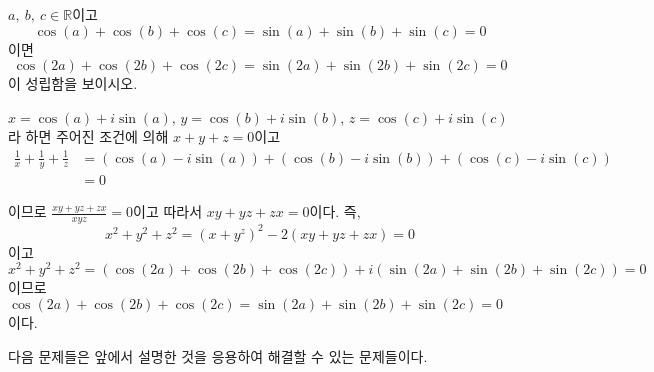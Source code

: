 \documentclass[11pt, a4paper]{book}
\begin{document}
\begin{example}
$a, \:b, \:c \in \mathbb{R}$이고
\begin{equation*}
	\cos(a) + \cos(b) +\cos(c) =\sin(a)+\sin(b)+\sin(c) =0
\end{equation*}
이면
\begin{equation*}
	\cos(2a)+\cos(2b)+\cos(2c) = \sin(2a)+\sin(2b)+\sin(2c) =0
\end{equation*}
이 성립함을 보이시오.
\begin{solution}
	$x=\cos(a)+i\sin(a)$, $y=\cos(b)+i\sin(b)$, $z=\cos(c)+i\sin(c)$라 하면 주어진 조건에 의해 $x+y+z=0$이고
	\begin{align*}
		\frac{1}{x} + \frac{1}{y} +\frac{1}{z}&=\left(\cos(a)-i \sin(a)\right) +\left(\cos(b)-i \sin(b)\right) +\left(\cos(c)-i \sin(c)\right) \\
		&=0
	\end{align*}
\end{solution}
이므로 $\frac{xy+yz+zx}{xyz}=0$이고 따라서 $xy+yz+zx=0$이다. 즉,
$$
x^{2} +y^{2} +z^{2} = (x+y^z)^{2} - 2(xy+yz+zx) =0
$$
이고 
$$
x^{2} +y^{2} +z^{2} =(\cos(2a)+\cos(2b)+\cos(2c)) + i (\sin(2a)+\sin(2b)+\sin(2c)) =0
$$
이므로 $\cos(2a)+\cos(2b)+\cos(2c) = \sin(2a)+\sin(2b)+\sin(2c) =0$이다.
\end{example}
다음 문제들은 앞에서 설명한 것을 응용하여 해결할 수 있는 문제들이다.
\end{document}
